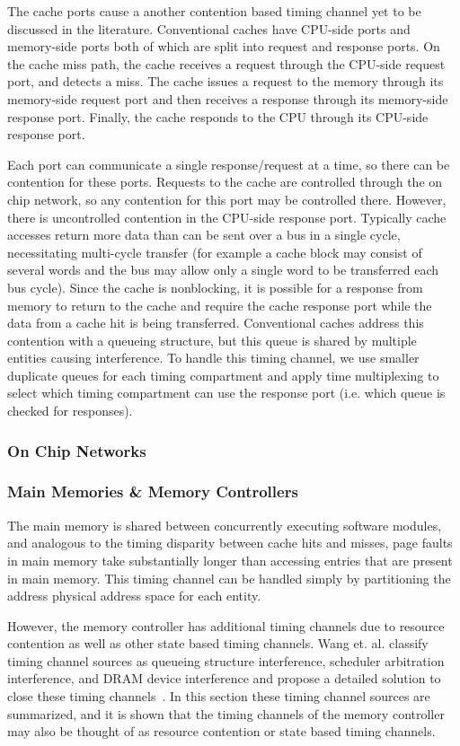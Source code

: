 The cache ports cause a another contention based timing channel yet to be 
discussed in the literature. Conventional caches have CPU-side ports and 
memory-side ports both of which are split into request and response ports. On 
the cache miss path, the cache receives a request through the CPU-side request 
port, and detects a miss. The cache issues a request to the memory through its 
memory-side request port and then receives a response through its memory-side 
response port. Finally, the cache responds to the CPU through its CPU-side 
response port.

Each port can communicate a single response/request at a time, so there can be 
contention for these ports. Requests to the cache are controlled through the on 
chip network, so any contention for this port may be controlled there. However, 
there is uncontrolled contention in the CPU-side response port. Typically cache 
accesses return more data than can be sent over a bus in a single cycle, 
necessitating multi-cycle transfer (for example a cache block may consist of 
several words and the bus may allow only a single word to be transferred each 
bus cycle). Since the cache is nonblocking, it is possible for a response from 
memory to return to the cache and require the cache response port while the 
data from a cache hit is being transferred. Conventional caches address this 
contention with a queueing structure, but this queue is shared by multiple 
entities causing interference. To handle this timing channel, we use smaller 
duplicate queues for each timing compartment and apply time multiplexing to 
select which timing compartment can use the response port (i.e. which queue is 
checked for responses).

\subsubsection{On Chip Networks}
\subsubsection{Main Memories \& Memory Controllers}
The main memory is shared between concurrently executing software modules, and 
analogous to the timing disparity between cache hits and misses, page faults in 
main memory take substantially longer than accessing entries that are present 
in main memory. This timing channel can be handled simply by partitioning the 
address physical address space for each entity.

However, the memory controller has additional timing channels due to resource 
contention as well as other state based timing channels. Wang et. al. classify 
timing channel sources as queueing structure interference, scheduler 
arbitration interference, and DRAM device interference and propose a detailed 
solution to close these timing channels~\cite{ushpca14}.  In this section these 
timing channel sources are summarized, and it is shown that the timing channels 
of the memory controller may also be thought of as resource contention or state 
based timing channels.

